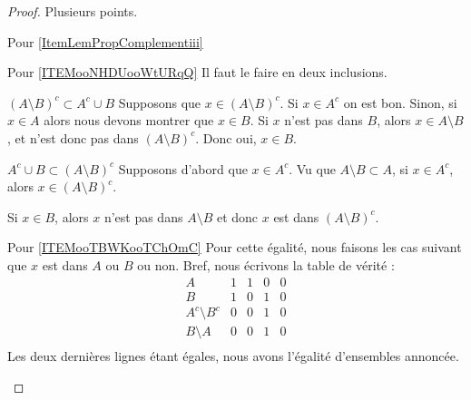 \begin{proof}
    Plusieurs points.
    \begin{subproof}
    \item[Pour \ref{ItemLemPropComplementiii}]
    \item[Pour \ref{ITEMooNHDUooWtURqQ}]
        Il faut le faire en deux inclusions.
        \begin{subproof}
        \item[\( (A\setminus B)^c\subset A^c\cup B\)]
            Supposons que \( x\in(A\setminus B)^c\). Si \( x\in A^c\) on est bon. Sinon, si \( x\in A\) alors nous devons montrer que \( x\in B\). Si \( x\) n'est pas dans \( B\), alors \( x\in A\setminus B\), et n'est donc pas dans \( (A\setminus B)^c\). Donc oui, \( x\in B\).
        \item[\( A^c\cup B\subset (A\setminus B)^c\)]
            Supposons d'abord que \( x\in A^c\). Vu que \( A\setminus B\subset A\), si \( x\in A^c\), alors \( x\in (A\setminus B)^c\).

            Si \( x\in B\), alors \( x\) n'est pas dans \( A\setminus B\) et donc \( x\) est dans \( (A\setminus B)^c\).
        \end{subproof}
    \item[Pour \ref{ITEMooTBWKooTChOmC}]
        Pour cette égalité, nous faisons les cas suivant que \( x\) est dans \( A\) ou \( B\) ou non. Bref, nous écrivons la table de vérité :
\begin{equation}       
    \begin{array}{|c|c|c|c|c|}
        \hline%
        A   &   1   & 1 & 0 & 0\\
        \hline%
        B&1&0&1&0\\
        \hline%
        A^c\setminus B^c & 0 & 0 &1&0\\
        \hline%
        B\setminus A & 0 & 0 &1&0\\
    \end{array}
\end{equation}
Les deux dernières lignes étant égales, nous avons l'égalité d'ensembles annoncée.
    \end{subproof}
\end{proof}

